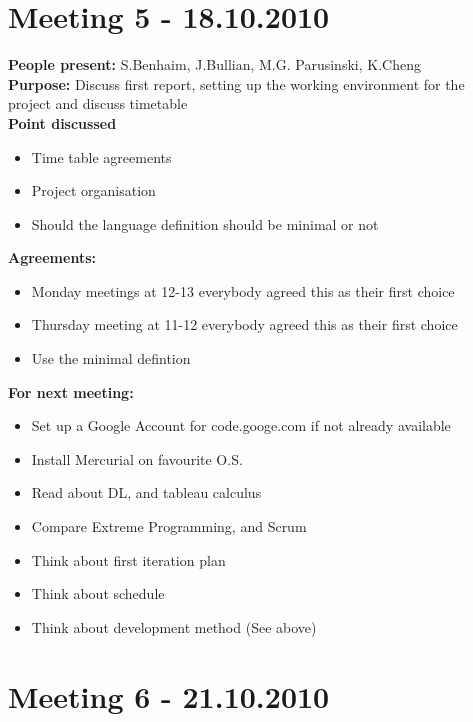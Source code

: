 \documentclass[12pt]{article}
\begin{document}
\section*{Meeting 5 - 18.10.2010}

\textbf{People present:} S.Benhaim, J.Bullian, M.G. Parusinski, K.Cheng \\
\textbf{Purpose:} Discuss first report, setting up the working environment for the project  and discuss timetable\\
\textbf{Point discussed}
\begin{itemize}
\item Time table agreements
\item Project organisation
\item Should the language definition should be minimal or not
\end{itemize}
\textbf{Agreements:}
\begin{itemize}
\item Monday meetings at 12-13 everybody agreed this as their first choice
\item Thursday meeting at 11-12 everybody agreed this as their first choice
\item Use the minimal defintion
\end{itemize}
\textbf{For next meeting:}
\begin{itemize}
\item Set up a Google Account for code.googe.com if not already available
\item Install Mercurial on favourite O.S.
\item Read about DL, and tableau calculus
\item Compare Extreme Programming, and Scrum
\item Think about first iteration plan
\item Think about schedule
\item Think about development method (See above)
\end{itemize}

\section*{Meeting 6 - 21.10.2010}
\end{document}
